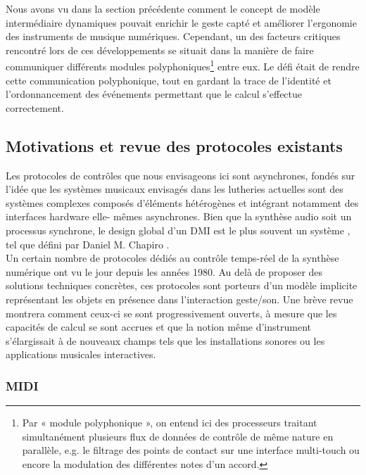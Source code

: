 \indent Nous avons vu dans la section précédente comment le concept de modèle intermédiaire dynamiques pouvait enrichir le geste capté et améliorer l’ergonomie des instruments de musique numériques. Cependant, un des facteurs critiques rencontré lors de ces développements se situait dans la manière de faire communiquer différents modules polyphoniques\footnote{ Par « module polyphonique », on entend ici des processeurs traitant simultanément plusieurs flux de données de contrôle de même nature en parallèle, e.g. le filtrage des points de contact sur une interface multi-touch ou encore la modulation des différentes notes d'un accord.} entre eux. Le défi était de rendre cette communication polyphonique, tout en gardant la trace de l'identité et l'ordonnancement des événements permettant que le calcul s'effectue correctement.

\subsection{Motivations et revue des protocoles existants}

\noindent Les protocoles de contrôles que nous envisageons ici sont asynchrones, fondés sur l’idée que les systèmes musicaux envisagés dans les lutheries actuelles sont des systèmes complexes composés d’éléments hétérogènes et intégrant notamment des interfaces hardware elle- mêmes asynchrones. Bien que la synthèse audio soit un processus synchrone, le design global d'un \gls{DMI} est le plus souvent un système , tel que défini par Daniel M. Chapiro \cite{chapiro_globally-asynchronous_1984}.\\
\indent Un certain nombre de protocoles dédiés au contrôle temps-réel de la synthèse numérique ont vu le jour depuis les années 1980. Au delà de proposer des solutions techniques concrètes, ces protocoles sont porteurs d’un modèle implicite représentant les objets en présence dans l’interaction geste/son. Une brève revue montrera comment ceux-ci se sont progressivement ouverts, à mesure que les capacités de calcul se sont accrues et que la notion même d’instrument s’élargissait à de nouveaux champs tels que les installations sonores ou les applications musicales interactives.

\subsubsection{MIDI}

